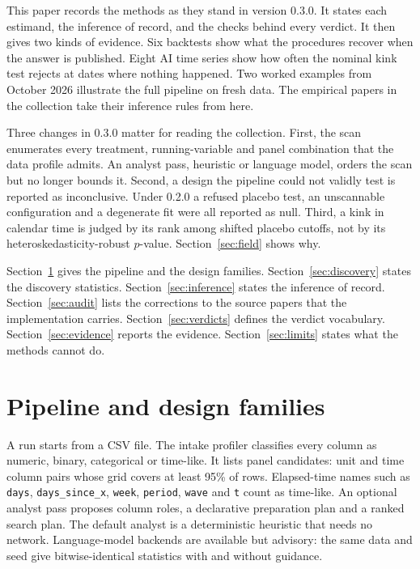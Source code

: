 \documentclass[11pt]{article}
\newcommand{\code}[1]{\texttt{#1}}
\begin{document}
This paper records the methods as they stand in version 0.3.0. It states each estimand,
the inference of record, and the checks behind every verdict. It then gives two kinds of
evidence. Six backtests show what the procedures recover when the answer is published.
Eight AI time series show how often the nominal kink test rejects at dates where nothing
happened. Two worked examples from October 2026 illustrate the full pipeline on fresh
data. The empirical papers in the collection take their inference rules from here.

Three changes in 0.3.0 matter for reading the collection. First, the scan enumerates
every treatment, running-variable and panel combination that the data profile admits.
An analyst pass, heuristic or language model, orders the scan but no longer bounds it.
Second, a design the pipeline could not validly test is reported as inconclusive. Under
0.2.0 a refused placebo test, an unscannable configuration and a degenerate fit were all
reported as null. Third, a kink in calendar time is judged by its rank among shifted
placebo cutoffs, not by its heteroskedasticity-robust $p$-value. Section~\ref{sec:field}
shows why.

Section~\ref{sec:pipeline} gives the pipeline and the design families.
Section~\ref{sec:discovery} states the discovery statistics. Section~\ref{sec:inference}
states the inference of record. Section~\ref{sec:audit} lists the corrections to the
source papers that the implementation carries. Section~\ref{sec:verdicts} defines the
verdict vocabulary. Section~\ref{sec:evidence} reports the evidence.
Section~\ref{sec:limits} states what the methods cannot do.

\section{Pipeline and design families}\label{sec:pipeline}

A run starts from a CSV file. The intake profiler classifies every column as numeric, binary, categorical or time-like.
It lists panel candidates: unit and time column pairs whose grid covers at least 95\% of
rows. Elapsed-time names such as
\code{days}, \code{days\_since\_x}, \code{week}, \code{period}, \code{wave} and \code{t}
count as time-like. An optional analyst pass proposes column roles, a declarative
preparation plan and a ranked search plan. The default analyst is a deterministic
heuristic that needs no network. Language-model backends are available but advisory:
the same data and seed give bitwise-identical statistics with and without guidance.
\end{document}
